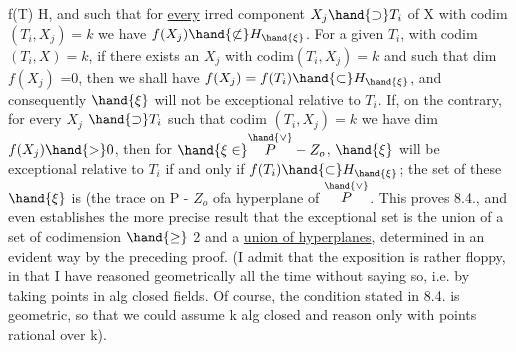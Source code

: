  f(T) \hand{$\subset$} H, and such that for \uline{every} irred component $X_j \hand{\supset} T_i$ of X
with codim $(T_i,X_j)=k$ we have $f(X_j)\hand{\not\subset} H_{\hand{\xi}}$. For a given $T_i$,
 with codim$(T_i,X)=k$, if there exists an $X_j$ with codim$(T_i,X_j)=k$
and such that dim $f(X_j)$ =0, then 
 we shall have $f(X_j) = f(T_i) \hand{\subset} H_{\hand{\xi}}$, and consequently $\hand{\xi}$ will
not be exceptional relative to $T_i$. If, on the contrary, for every $X_j$
$\hand{\supset} T_i$ such that codim $(T_i,X_j) = k$ we have dim $f(X_j) \hand{>} 0$, then for
$\hand{\xi \in} \overset{\hand{\vee}}{P} - Z_o$, $\hand{\xi}$ will be exceptional relative to $T_i$ if and only if
$f(T_i) \hand{\subset} H_{\hand{\xi}}$; the set of these $\hand{\xi}$ is (the trace on P - $Z_o$ of\hand{)}a hyperplane
of $\overset{\hand{\vee}}{P}$. This proves 8.4., and even establishes the more precise result
that the exceptional set is the union of a set of codimension
$\hand{\geq}$ 2 and a \uline{union of hyperplanes}, determined in an evident way by the
preceding proof. (I admit that the exposition is rather floppy, 
in that I have reasoned geometrically all the time without saying so, i.e.
by taking points in alg closed fields. Of course, the condition
stated in 8.4. is  geometric, so that we could assume
k alg closed and reason only with points rational over k).

 

